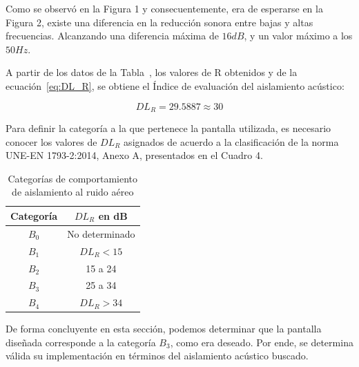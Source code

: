 \par Como se observó en la Figura 1 y consecuentemente, era de esperarse en la Figura 2, existe una diferencia en la reducción sonora entre bajas y altas frecuencias. Alcanzando una diferencia máxima de $16dB$, y un valor máximo a los $50Hz$.

\par A partir de los datos de la Tabla~, los valores de R obtenidos y de la ecuación~\eqref{eq:DL_R}, se obtiene el Índice de evaluación del aislamiento acústico:

\begin{equation*}
    DL_R =   29.5887 \approx 30
\end{equation*}

\par Para definir la categoría a la que pertenece la pantalla utilizada, es necesario conocer los valores de $DL_R$ asignados de acuerdo a la clasificación de la norma UNE-EN 1793-2:2014, Anexo A, presentados en el Cuadro 4. 

\begin{table}[H]
    \centering
    \begin{tabular}{|c|c|} \hline
        \textbf{Categoría} & \textbf{$DL_R$ en dB} \\ \hline \hline
         $B_0$ & No determinado \\ \hline
         $B_1$ & $DL_R < 15$  \\ \hline
         $B_2$ & 15 a 24 \\ \hline
         $B_3$ & 25 a 34 \\ \hline
         $B_4$ & $DL_R > 34$ \\ \hline
    \end{tabular}
    \caption{Categorías de comportamiento de aislamiento al ruido aéreo}
    \label{tab:categorias_aislamiento}
\end{table}


\par De forma concluyente en esta sección, podemos determinar que la pantalla diseñada  corresponde a la categoría $B_3$, como era deseado. Por ende, se determina válida su implementación en términos del aislamiento acústico buscado. 